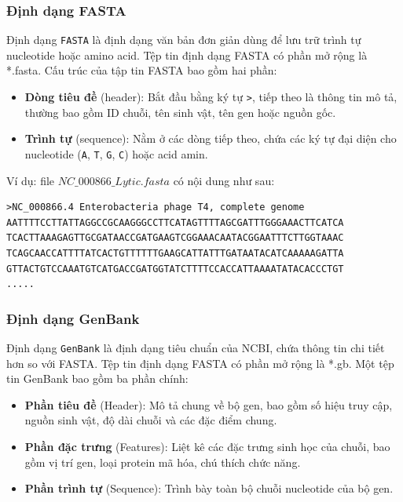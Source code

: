 \subsubsection{Định dạng FASTA}

Định dạng \texttt{FASTA} là định dạng văn bản đơn giản dùng để lưu trữ trình tự nucleotide hoặc amino acid. Tệp tin định dạng FASTA có phần mở rộng là *.fasta. Cấu trúc của tập tin FASTA bao gồm hai phần:

\begin{itemize}
    \item \textbf{Dòng tiêu đề} (header): Bắt đầu bằng ký tự \texttt{>}, tiếp theo là thông tin mô tả, thường bao gồm ID chuỗi, tên sinh vật, tên gen hoặc nguồn gốc.
    \item \textbf{Trình tự} (sequence): Nằm ở các dòng tiếp theo, chứa các ký tự đại diện cho nucleotide (\texttt{A}, \texttt{T}, \texttt{G}, \texttt{C}) hoặc acid amin.
\end{itemize}

\noindent Ví dụ: file $NC\_000866\_Lytic.fasta$ có nội dung như sau:
\begin{verbatim}
>NC_000866.4 Enterobacteria phage T4, complete genome
AATTTTCCTTATTAGGCCGCAAGGGCCTTCATAGTTTTAGCGATTTGGGAAACTTCATCA
TCACTTAAAGAGTTGCGATAACCGATGAAGTCGGAAACAATACGGAATTTCTTGGTAAAC
TCAGCAACCATTTTATCACTGTTTTTTGAAGCATTATTTGATAATACATCAAAAAGATTA
GTTACTGTCCAAATGTCATGACCGATGGTATCTTTTCCACCATTAAAATATACACCCTGT
.....
\end{verbatim}

\subsubsection{Định dạng GenBank}

Định dạng \texttt{GenBank} là định dạng tiêu chuẩn của NCBI, chứa thông tin chi tiết hơn so với FASTA. Tệp tin định dạng FASTA có phần mở rộng là *.gb.  Một tệp tin GenBank bao gồm ba phần chính:

\begin{itemize}
    \item \textbf{Phần tiêu đề} (Header): Mô tả chung về bộ gen, bao gồm số hiệu truy cập, nguồn sinh vật, độ dài chuỗi và các đặc điểm chung.
    \item \textbf{Phần đặc trưng} (Features): Liệt kê các đặc trưng sinh học của chuỗi, bao gồm vị trí gen, loại protein mã hóa, chú thích chức năng.
    \item \textbf{Phần trình tự} (Sequence): Trình bày toàn bộ chuỗi nucleotide của bộ gen.
\end{itemize}

